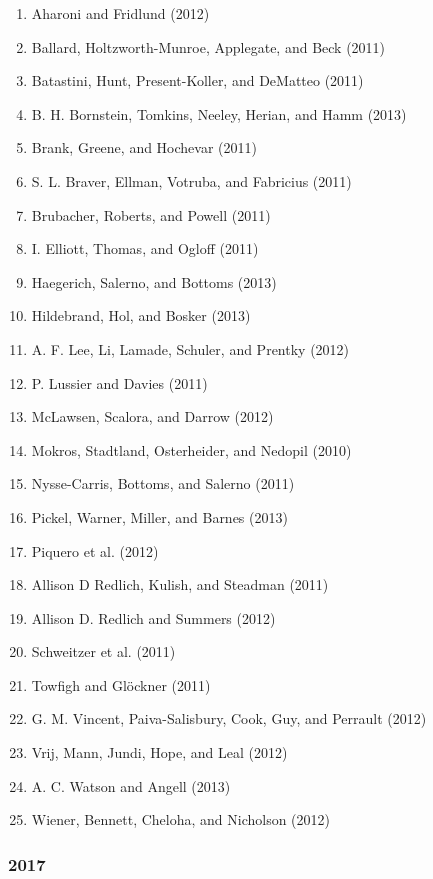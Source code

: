 \documentclass[english,man]{apa6}
\providecommand{\tightlist}{%
  \setlength{\itemsep}{0pt}\setlength{\parskip}{0pt}}
\theoremstyle{definition}
\theoremstyle{definition}
\theoremstyle{definition}
\theoremstyle{remark}
\begin{document}
\begin{enumerate}
\def\labelenumi{\arabic{enumi})}
\tightlist
\item
  Aharoni and Fridlund (2012)
\item
  Ballard, Holtzworth-Munroe, Applegate, and Beck (2011)
\item
  Batastini, Hunt, Present-Koller, and DeMatteo (2011)
\item
  B. H. Bornstein, Tomkins, Neeley, Herian, and Hamm (2013)
\item
  Brank, Greene, and Hochevar (2011)
\item
  S. L. Braver, Ellman, Votruba, and Fabricius (2011)
\item
  Brubacher, Roberts, and Powell (2011)
\item
  I. Elliott, Thomas, and Ogloff (2011)
\item
  Haegerich, Salerno, and Bottoms (2013)
\item
  Hildebrand, Hol, and Bosker (2013)
\item
  A. F. Lee, Li, Lamade, Schuler, and Prentky (2012)
\item
  P. Lussier and Davies (2011)
\item
  McLawsen, Scalora, and Darrow (2012)
\item
  Mokros, Stadtland, Osterheider, and Nedopil (2010)
\item
  Nysse-Carris, Bottoms, and Salerno (2011)
\item
  Pickel, Warner, Miller, and Barnes (2013)
\item
  Piquero et al. (2012)
\item
  Allison D Redlich, Kulish, and Steadman (2011)
\item
  Allison D. Redlich and Summers (2012)
\item
  Schweitzer et al. (2011)
\item
  Towfigh and Glöckner (2011)
\item
  G. M. Vincent, Paiva-Salisbury, Cook, Guy, and Perrault (2012)
\item
  Vrij, Mann, Jundi, Hope, and Leal (2012)
\item
  A. C. Watson and Angell (2013)
\item
  Wiener, Bennett, Cheloha, and Nicholson (2012)
\end{enumerate}

\subsubsection{2017}\label{section-27}
\end{document}

